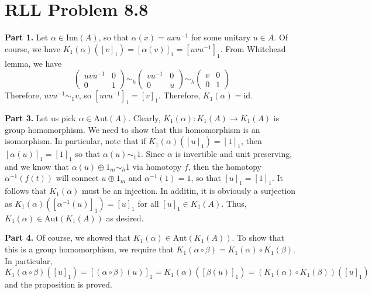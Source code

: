 \documentclass[aps,pra,showpacs,notitlepage,onecolumn,superscriptaddress,nofootinbib]{revtex4-1}
\theoremstyle{definition}
\begin{document}
\section{RLL Problem 8.8}

\noindent \textbf{Part 1.} Let $\alpha \in \text{Inn}(A)$, so that $\alpha(x) = uxu^{-1}$ for some unitary $u \in A$. Of course, we have $K_1(\alpha)([v]_1) = [\alpha(v)]_1 = [uvu^{-1}]_1$.
From Whitehead lemma, we have
\begin{equation}
  \begin{pmatrix} uvu^{-1} & 0 \\ 0 & 1 \end{pmatrix} \sim_h \begin{pmatrix} vu^{-1} & 0 \\ 0 & u \end{pmatrix} \sim_h \begin{pmatrix} v & 0 \\ 0 & 1 \end{pmatrix}
\end{equation}
Therefore, $uvu^{-1} \sim_1 v$, so $[uvu^{-1}]_1 = [v]_1$. Therefore, $K_1(\alpha) = \text{id}$.
\newline

\begin{comment}
\textbf{Part 2.} Let $\alpha \in \overline{\text{Inn}(A)}$. It follows that for each finite subset $F$ of $A$ and $\varepsilon > 0$, there exists an inner automorphism
$\beta$ such that $||\alpha(x) - \beta(x)|| < \varepsilon$ for all $x \in F$. From here, note that $K_1(\alpha)([u]_1) = [\alpha(u)]_1$
\end{comment}

\noindent \textbf{Part 3.} Let us pick $\alpha \in \text{Aut}(A)$. Clearly, $K_1(\alpha) : K_1(A) \rightarrow K_1(A)$ is group homomorphism. We need to show that this homomorphism is an
isomorphism. In particular, note that if $K_1(\alpha)([u]_1) = [1]_1$, then $[\alpha(u)]_1 = [1]_1$ so that $\alpha(u) \sim_1 1$. Since $\alpha$ is invertible and unit preserving, and we know
that $\alpha(u) \oplus 1_m \sim_h 1$ via homotopy $f$, then the homotopy $\alpha^{-1}(f(t))$ will connect $u \oplus 1_m$ and $\alpha^{-1}(1) = 1$, so that $[u]_1 = [1]_1$. It
follows that $K_1(\alpha)$ must be an injection. In additin, it is obviously a surjection as $K_1(\alpha)([\alpha^{-1}(u)]_1) = [u]_1$ for all $[u]_1 \in K_1(A)$. Thus,
$K_1(\alpha) \in \text{Aut}(K_1(A))$ as desired.
\newline

\noindent \textbf{Part 4.} Of course, we showed that $K_1(\alpha) \in \text{Aut}(K_1(A))$. To show that this is a group homomorphism,
we require that $K_1(\alpha \circ \beta) = K_1(\alpha) \circ K_1(\beta)$. In particular,
\begin{equation}
  K_1(\alpha \circ \beta)([u]_1) = [(\alpha \circ \beta)(u)]_1 = K_1(\alpha)([\beta(u)]_1) = (K_1(\alpha) \circ K_1(\beta))([u]_1)
\end{equation}
and the proposition is proved.
\end{document}
